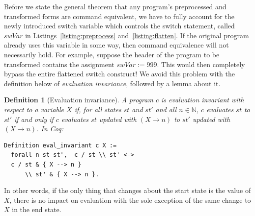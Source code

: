 \documentclass[compsoc,conference,a4paper,10pt,times]{IEEEtran}
\newtheorem{defin}[theorem]{Definition}
\newtheorem{example}[theorem]{Example}
\begin{document}


Before we state the general theorem that any program's preprocessed and transformed forms are command equivalent, we have to fully account for the newly introduced switch variable which controls the switch statement, called $swVar$ in Listings~\ref{listing:preprocess} and~\ref{listing:flatten}. If the original program already uses this variable in some way, then command equivalence will not necessarily hold. For example, suppose the header of the program to be transformed contains the assignment $swVar := 999$.  This would then completely bypass the entire flattened switch construct!  We avoid this problem with the definition below of \emph{evaluation invariance}, followed by a lemma about it.

\begin{defin}[Evaluation invariance]
A program $c$ is \emph{evaluation invariant} with respect to a variable $X$ if, for all states $st$ and $st'$ and all $n \in \mathbb{N}$, $c$ evaluates $st$ to $st'$ if and only if $c$ evaluates $st$ updated with $(X \longrightarrow n)$ to $st'$ updated with $(X\longrightarrow n)$.
In Coq:
\begin{verbatim}
Definition eval_invariant c X := 
  forall n st st',  c / st \\ st' <-> 
  c / st & { X --> n } 
      \\ st' & { X --> n }.
\end{verbatim}
\end{defin}
In other words, if the only thing that changes about the start state is the value of $X$, there is no impact on evaluation with the sole exception of the same change to $X$ in the end state.  
\end{document}
